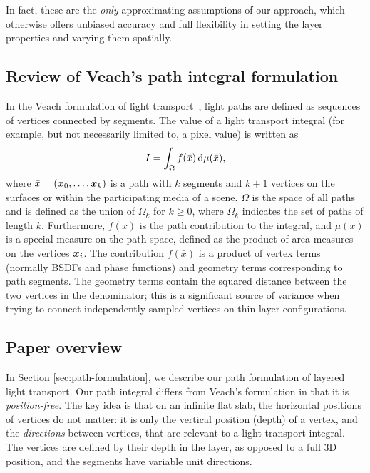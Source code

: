 In fact, these are the \emph{only} approximating assumptions of our approach, which otherwise offers unbiased accuracy and full flexibility in setting the layer properties and varying them spatially.

\subsection{Review of Veach's path integral formulation}
\label{subsec:path_int}

In the Veach formulation of light transport~, light paths are defined as sequences of vertices connected by segments.
The value of a light transport integral (for example, but not necessarily limited to, a pixel value) is written as
%
\begin{equation}
I = \int_\Omega f(\bar x) \,\mathrm{d} \mu(\bar x),
\end{equation}
%
where $\bar x = (\bm{x}_0, \dots, \bm{x}_k)$ is a path with $k$ segments and $k + 1$ vertices on the surfaces or within the participating media of a scene.
$\Omega$ is the space of all paths and is defined as the union of $\Omega_k$ for $k \geq 0$, where $\Omega_k$ indicates the set of paths of length $k$.
Furthermore, $f(\bar x)$ is the path contribution to the integral, and $\mu(\bar x)$ is a special measure on the path space, defined as the product of area measures on the vertices $\bm{x}_i$. The contribution $f(\bar x)$ is a product of vertex terms (normally BSDFs and phase functions) and geometry terms corresponding to path segments. The geometry terms contain the squared distance between the two vertices in the denominator; this is a significant source of variance when trying to connect independently sampled vertices on thin layer configurations.


\subsection{Paper overview}

In Section \ref{sec:path-formulation}, we describe our path formulation of layered light transport. Our path integral differs from Veach's formulation in that it is \emph{position-free}. The key idea is that on an infinite flat slab, the horizontal positions of vertices do not matter: it is only the vertical position (depth) of a vertex, and the \emph{directions} between vertices, that are relevant to a light transport integral. The vertices are defined by their depth in the layer, as opposed to a full 3D position, and the segments have variable unit directions.

